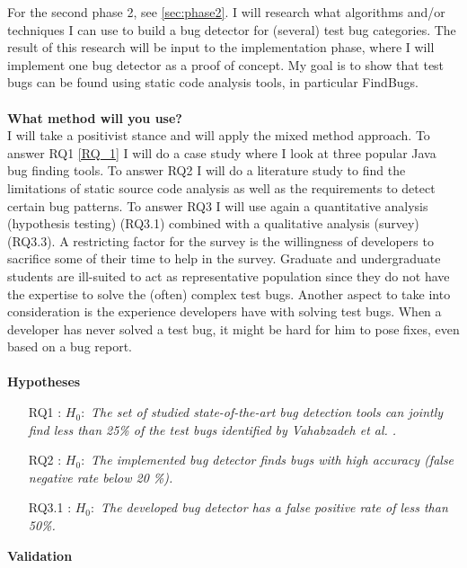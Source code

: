 \documentclass{uvamscse}
\newcommand{\Atestbugs}{Vahabzadeh et al.}
\begin{document}
For the second phase 2, see \ref{sec:phase2}. I will research what algorithms and/or techniques I can use to build a bug detector for (several) test bug categories. The result of this research will be input to the implementation phase, where I will implement one bug detector as a proof of concept. My goal is to show that test bugs can be found using static code analysis tools, in particular FindBugs. \\
\\
\textbf{What method will you use?}\\
I will take a positivist stance and will apply the mixed method approach. To answer RQ1 \ref{RQ_1} I will do a case study where I look at three popular Java bug finding tools. To answer RQ2 I will do a literature study to find the limitations of static source code analysis as well as the requirements to detect certain bug patterns. To answer RQ3 I will use again a quantitative analysis (hypothesis testing) (RQ3.1) combined with a qualitative analysis (survey) (RQ3.3). A restricting factor for the survey is the willingness of developers to sacrifice some of their time to help in the survey. Graduate and undergraduate students are ill-suited to act as representative population since they do not have the expertise to solve the (often) complex test bugs. Another aspect to take into consideration is the experience developers have with solving test bugs. When a developer has never solved a test bug, it might be hard for him to pose fixes, even based on a bug report.\\
\\
\textbf{Hypotheses}
\label{hyp}
\begin{enumerate}
	\item[RQ1]: $H_0:$ \textit{The set of studied state-of-the-art bug detection tools can jointly find less than 25\% of the test bugs identified by \Atestbugs{} \cite{vahabzadeh2015empirical}.}
	\item[RQ2]: $H_0:$ \textit{The implemented bug detector finds bugs with high accuracy (false negative rate below 20 \%).}
	\item[RQ3.1]: $H_0:$ \textit{The developed bug detector has a false positive rate of less than 50\%.}
	
\end{enumerate}
\textbf{Validation}
\end{document}
